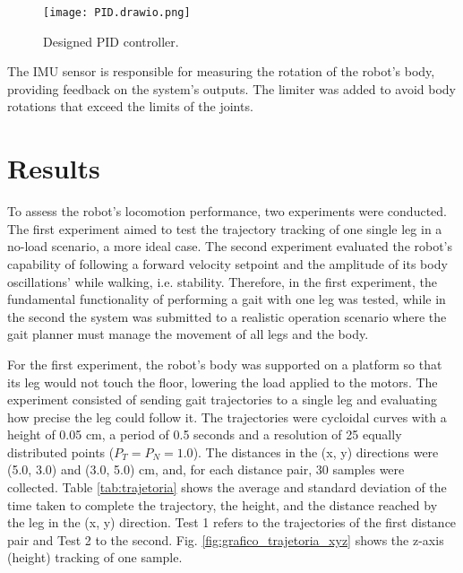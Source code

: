 \documentclass[conference]{IEEEtran}
\begin{document}
\begin{figure}[b]
  \vspace{-\baselineskip}
  \centering
  \texttt{[image: PID.drawio.png]}
  \caption{Designed PID controller.}
  \label{fig:pid}
\end{figure}

The IMU sensor is responsible for measuring the rotation of the robot's body, providing feedback on the system's outputs. The limiter was added to avoid body rotations that exceed the limits of the joints.

\section{Results} \label{results}

To assess the robot's locomotion performance, two experiments were conducted. The first experiment aimed to test the trajectory tracking of one single leg in a no-load scenario, a more ideal case. The second experiment evaluated the robot's capability of following a forward velocity setpoint and the amplitude of its body oscillations' while walking, i.e. stability. Therefore, in the first experiment, the fundamental functionality of performing a gait with one leg was tested, while in the second the system was submitted to a realistic operation scenario where the gait planner must manage the movement of all legs and the body.

For the first experiment, the robot's body was supported on a platform so that its leg would not touch the floor, lowering the load applied to the motors. The experiment consisted of sending gait trajectories to a single leg and evaluating how precise the leg could follow it. The trajectories were cycloidal curves with a height of 0.05 cm, a period of 0.5 seconds and a resolution of 25 equally distributed points ($P_T = P_N = 1.0$). The distances in the (x, y) directions were (5.0, 3.0) and (3.0, 5.0) cm, and, for each distance pair, 30 samples were collected. Table \ref{tab:trajetoria} shows the average and standard deviation of the time taken to complete the trajectory, the height, and the distance reached by the leg in the (x, y) direction. Test 1 refers to the trajectories of the first distance pair and Test 2 to the second. Fig. \ref{fig:grafico_trajetoria_xyz} shows the z-axis (height) tracking of one sample. 
\end{document}
